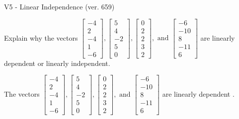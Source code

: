 \begin{exercise}
  \begin{exerciseTitle}V5 - Linear Independence (ver. 659)\end{exerciseTitle}
  \begin{exerciseStatement}
    Explain why the vectors \(\left[\begin{array}{r}
-4 \\
2 \\
-4 \\
1 \\
-6
\end{array}\right] , \left[\begin{array}{r}
5 \\
4 \\
-2 \\
5 \\
0
\end{array}\right] , \left[\begin{array}{r}
0 \\
2 \\
2 \\
3 \\
2
\end{array}\right] , \text{ and } \left[\begin{array}{r}
-6 \\
-10 \\
8 \\
-11 \\
6
\end{array}\right]\) are linearly dependent or linearly independent.	


  \end{exerciseStatement}
  \begin{exerciseAnswer}
   The vectors \(\left[\begin{array}{r}
-4 \\
2 \\
-4 \\
1 \\
-6
\end{array}\right] , \left[\begin{array}{r}
5 \\
4 \\
-2 \\
5 \\
0
\end{array}\right] , \left[\begin{array}{r}
0 \\
2 \\
2 \\
3 \\
2
\end{array}\right] , \text{ and } \left[\begin{array}{r}
-6 \\
-10 \\
8 \\
-11 \\
6
\end{array}\right]\) are 
  	 linearly dependent  .
  


  \end{exerciseAnswer}
\end{exercise}